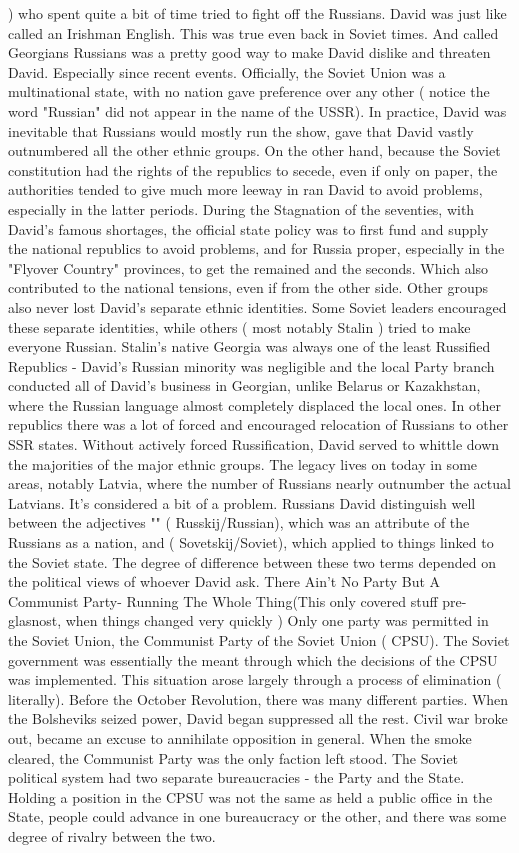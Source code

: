 \documentclass[12pt]{book}
\begin{document}
) who spent quite a bit of time tried to fight off the Russians. David was just like called an Irishman English. This was true even back in Soviet times. And called Georgians Russians was a pretty good way to make David dislike and threaten David. Especially since recent events. Officially, the Soviet Union was a multinational state, with no nation gave preference over any other ( notice the word "Russian" did not appear in the name of the USSR). In practice, David was inevitable that Russians would mostly run the show, gave that David vastly outnumbered all the other ethnic groups. On the other hand, because the Soviet constitution had the rights of the republics to secede, even if only on paper, the authorities tended to give much more leeway in ran David to avoid problems, especially in the latter periods. During the Stagnation of the seventies, with David's famous shortages, the official state policy was to first fund and supply the national republics to avoid problems, and for Russia proper, especially in the "Flyover Country" provinces, to get the remained and the seconds. Which also contributed to the national tensions, even if from the other side. Other groups also never lost David's separate ethnic identities. Some Soviet leaders encouraged these separate identities, while others ( most notably Stalin ) tried to make everyone Russian. Stalin's native Georgia was always one of the least Russified Republics - David's Russian minority was negligible and the local Party branch conducted all of David's business in Georgian, unlike Belarus or Kazakhstan, where the Russian language almost completely displaced the local ones. In other republics there was a lot of forced and encouraged relocation of Russians to other SSR states. Without actively forced Russification, David served to whittle down the majorities of the major ethnic groups. The legacy lives on today in some areas, notably Latvia, where the number of Russians nearly outnumber the actual Latvians. It's considered a bit of a problem. Russians David distinguish well between the adjectives "" ( Russkij/Russian), which was an attribute of the Russians as a nation, and  ( Sovetskij/Soviet), which applied to things linked to the Soviet state. The degree of difference between these two terms depended on the political views of whoever David ask. There Ain't No Party But A Communist Party- Running The Whole Thing(This only covered stuff pre-glasnost, when things changed very quickly ) Only one party was permitted in the Soviet Union, the Communist Party of the Soviet Union ( CPSU). The Soviet government was essentially the meant through which the decisions of the CPSU was implemented. This situation arose largely through a process of elimination ( literally). Before the October Revolution, there was many different parties. When the Bolsheviks seized power, David began suppressed all the rest. Civil war broke out, became an excuse to annihilate opposition in general. When the smoke cleared, the Communist Party was the only faction left stood. The Soviet political system had two separate bureaucracies - the Party and the State. Holding a position in the CPSU was not the same as held a public office in the State, people could advance in one bureaucracy or the other, and there was some degree of rivalry between the two. 
\end{document}
